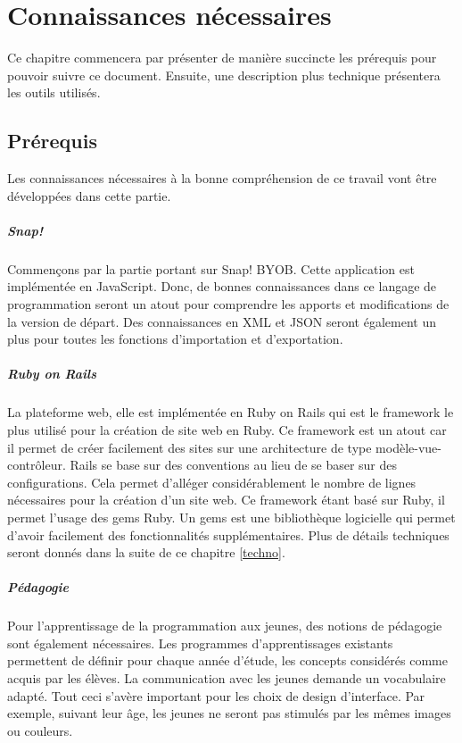 \chapter{Connaissances nécessaires}
Ce chapitre commencera par présenter de manière succincte les prérequis pour pouvoir suivre ce document. Ensuite, une description plus technique présentera les outils utilisés.

\section{Prérequis}
Les connaissances nécessaires à la bonne compréhension de ce travail vont être développées dans cette partie.

\paragraph{Snap!}
Commençons par la partie portant sur Snap! BYOB. Cette application est implémentée en JavaScript. Donc, de bonnes connaissances dans ce langage de programmation seront un atout pour comprendre les apports et modifications de la version de départ. Des connaissances en XML et JSON seront également un plus pour toutes les fonctions d'importation et d'exportation.

\paragraph{Ruby on Rails}
La plateforme web, elle est implémentée en Ruby on Rails qui est le framework le plus utilisé pour la création de site web en Ruby. Ce framework est un atout car il permet de créer facilement des sites sur une architecture de type modèle-vue-contrôleur. Rails se base sur des conventions au lieu de se baser sur des configurations. Cela permet d'alléger considérablement le nombre de lignes nécessaires pour la création d'un site web. Ce framework étant basé sur Ruby, il permet l'usage des gems Ruby. Un gems est une bibliothèque logicielle qui permet d'avoir facilement des fonctionnalités supplémentaires. Plus de détails techniques seront donnés dans la suite de ce chapitre \ref{techno}. %

\paragraph{Pédagogie}
Pour l'apprentissage de la programmation aux jeunes, des notions de pédagogie sont également nécessaires. 
Les programmes d'apprentissages existants permettent de définir pour chaque année d'étude, les concepts considérés comme acquis par les élèves. La communication avec les jeunes demande un vocabulaire adapté. Tout ceci s'avère important pour les choix de design d'interface. Par exemple, suivant leur âge, les jeunes ne seront pas stimulés par les mêmes images ou couleurs. %


